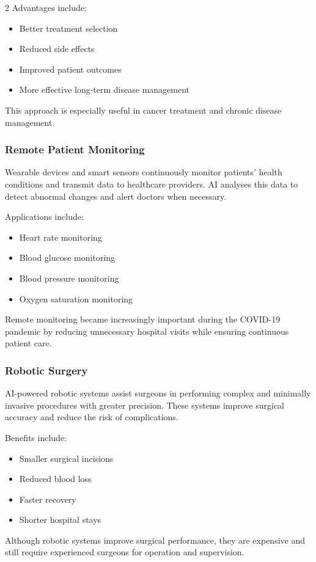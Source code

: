 \begin{multicols}{2}
  \noindent
  Advantages include:
  \begin{itemize}
    \item Better treatment selection
    \item Reduced side effects
    \item Improved patient outcomes
    \item More effective long-term disease management
  \end{itemize}

  This approach is especially useful in cancer treatment and chronic disease management.

  \subsubsection*{Remote Patient Monitoring}
  Wearable devices and smart sensors continuously monitor patients' health conditions and transmit data to healthcare providers. AI analyses this data to detect abnormal changes and alert doctors when necessary.

  \noindent
  Applications include:
  \begin{itemize}
    \item Heart rate monitoring
    \item Blood glucose monitoring
    \item Blood pressure monitoring
    \item Oxygen saturation monitoring
  \end{itemize}

  Remote monitoring became increasingly important during the COVID-19 pandemic by reducing unnecessary hospital visits while ensuring continuous patient care.

  \subsubsection*{Robotic Surgery}
  AI-powered robotic systems assist surgeons in performing complex and minimally invasive procedures with greater precision. These systems improve surgical accuracy and reduce the risk of complications.

  \noindent
  Benefits include:
  \begin{itemize}
    \item Smaller surgical incisions
    \item Reduced blood loss
    \item Faster recovery
    \item Shorter hospital stays
  \end{itemize}
  Although robotic systems improve surgical performance, they are expensive and still require experienced surgeons for operation and supervision.


\end{multicols}
